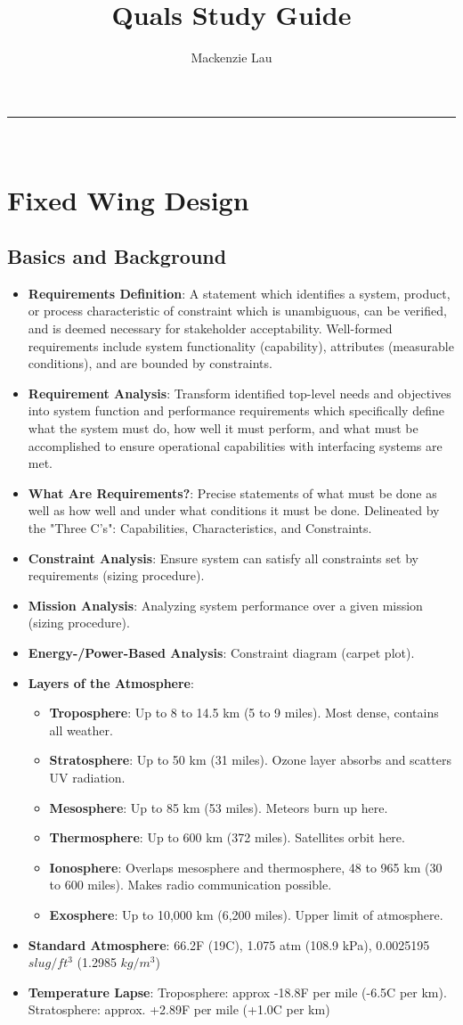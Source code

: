 \documentclass[12pt]{article}
\title{\vspace{-2cm}Quals Study Guide}
\author{Mackenzie Lau}
\date{}
\newcommand{\Hrule}{\rule{\textwidth}{0.2mm}\\}
\newcommand{\Item}[1]{\item \textbf{#1}:}
\begin{document}
\maketitle
\thispagestyle{empty}
\vspace{-1cm}
\Hrule
\vspace{-1cm}
\pagestyle{empty}
\tableofcontents
\newpage
\pagestyle{plain}
\setcounter{page}{1}
\section{Fixed Wing Design}
\subsection{Basics and Background}
\begin{itemize}
\Item{Requirements Definition} A statement which identifies a system, product, or process characteristic of constraint which is unambiguous, can be verified, and is deemed necessary for stakeholder acceptability. Well-formed requirements include system functionality (capability), attributes (measurable conditions), and are bounded by constraints.
\Item{Requirement Analysis} Transform identified top-level needs and objectives into system function and performance requirements which specifically define what the system must do, how well it must perform, and what must be accomplished to ensure operational capabilities with interfacing systems are met.
\Item{What Are Requirements?} Precise statements of what must be done as well as how well and under what conditions it must be done. Delineated by the "Three C's": Capabilities, Characteristics, and Constraints.
\Item{Constraint Analysis} Ensure system can satisfy all constraints set by requirements (sizing procedure).
\Item{Mission Analysis} Analyzing system performance over a given mission (sizing procedure).
\Item{Energy-/Power-Based Analysis} Constraint diagram (carpet plot).
\Item{Layers of the Atmosphere}
	\begin{itemize}
	\Item{Troposphere} Up to 8 to 14.5 km (5 to 9 miles). Most dense, contains all weather.
	\Item{Stratosphere} Up to 50 km (31 miles). Ozone layer absorbs and scatters UV radiation.
	\Item{Mesosphere} Up to 85 km (53 miles). Meteors burn up here.
	\Item{Thermosphere} Up to 600 km (372 miles). Satellites orbit here.
	\Item{Ionosphere} Overlaps mesosphere and thermosphere, 48 to 965 km (30 to 600 miles). Makes radio communication possible.
	\Item{Exosphere} Up to 10,000 km (6,200 miles). Upper limit of atmosphere.
	\end{itemize}
\Item{Standard Atmosphere} 66.2\degree F (19\degree C), 1.075 atm (108.9 kPa), 0.0025195 $slug/ft^3$ (1.2985 $kg/m^3$)
\Item{Temperature Lapse} Troposphere: approx -18.8\degree F per mile (-6.5\degree C per km). Stratosphere: approx. +2.89\degree F per mile (+1.0\degree C per km)
\end{itemize}
\end{document}
